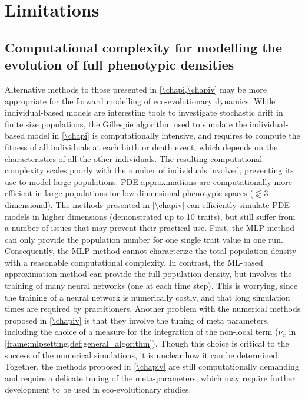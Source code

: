 \section{Limitations}

\subsection{Computational complexity for modelling the evolution of full phenotypic densities}
Alternative methods to those presented in \cref{\chapi,\chapiv} may be more appropriate for the forward modelling of eco-evolutionary dynamics.
% 
While individual-based models are interesting tools to investigate stochastic drift in finite size populations, the Gillespie algorithm \citep{Gillespie1976} used to simulate the individual-based model in \cref{\chapi} is computationally intensive, and requires to compute the fitness of all individuals at each birth or death event, which depends on the characteristics of all the other individuals. The resulting computational complexity scales poorly with the number of individuals involved, preventing its use to model large populations. 
% 
PDE approximations are computationally more efficient in large populations for low dimensional phenotypic spaces ($\lessapprox 3$-dimensional). 
% 
% 
The methods presented in \cref{\chapiv} can efficiently simulate PDE models in higher dimensions (demonstrated up to 10 traits), but still suffer from a number of issues that may prevent their practical use.
% 
First, the MLP method can only provide the population number for one single trait value in one run. Consequently, the MLP method cannot characterize the total population density with a reasonable computational complexity. 
% 
In contrast, the ML-based approximation method can provide the full population density, but involves the training of many neural networks (one at each time step). This is worrying, since the training of a neural network is numerically costly, and that long simulation times are required by practitioners. Another problem with the numerical methods proposed in \cref{\chapiv} is that they involve the tuning of meta parameters, including the choice of a measure for the integration of the non-local term ($\nu_x$ in \cref{frame:mlpsetting,def:general_algorithm}). Though this choice is critical to the success of the numerical simulations, it is unclear how it can be determined.
% 
Together, the methods proposed in \cref{\chapiv} are still computationally demanding and require a delicate tuning of the meta-parameters, which may require further development to be used in eco-evolutionary studies. 

